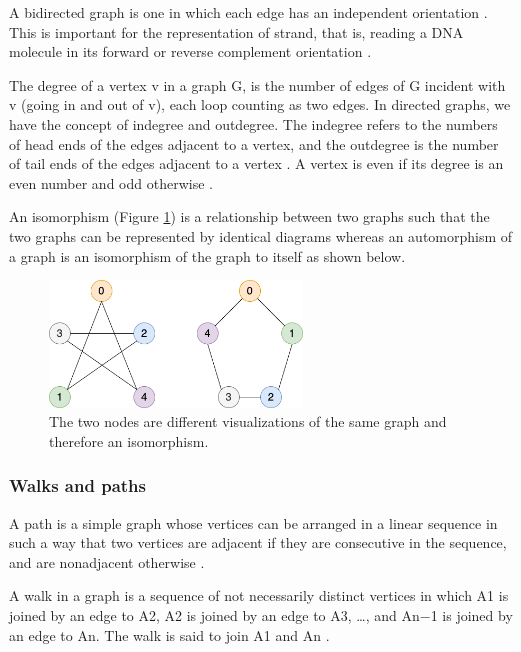 \documentclass[10pt, a4paper]{article}
\begin{document}
A bidirected graph is one in which each edge has an independent orientation
\cite{edmondsMatchingWellSolvedClass2003}.
This is important for the representation of strand,
that is, reading a DNA molecule in its forward or reverse complement orientation
\cite{patenGenomeGraphsEvolution2017}.

The degree of a vertex v in a graph G, is the number of edges of G incident with
v (going in and out of v), each loop counting as two edges.
In directed graphs, we have the concept of indegree and outdegree.
The indegree refers to the numbers of head ends of the edges adjacent to a
vertex, and the outdegree is the number of tail ends of the edges adjacent to a
vertex \cite{bondyGraphTheory2011}. A vertex is even if its degree is an even number
and odd otherwise \cite{trudeauIntroductionGraphTheory1993}.

An isomorphism (Figure \ref{fig:orgf79db24}) is a relationship between two graphs such
that the two graphs can be represented by identical diagrams
\cite{bondyGraphTheory2011}
whereas an automorphism of a graph is an isomorphism of the graph to itself as
shown below.

\begin{figure}[h]
\centering
\includegraphics[width=0.6\textwidth]{../Figures/Isomorphism.png}
\caption[A graph isomorphism]{\label{fig:orgf79db24}The two nodes are different visualizations of the same graph and therefore an isomorphism.}
\end{figure}

\subsubsection{Walks and paths}
\label{sec:orgdcf114f}
A path is a simple graph whose vertices can be arranged in a linear sequence in
such a way that two vertices are adjacent if they are consecutive in the
sequence, and are nonadjacent otherwise \cite{bondyGraphTheory2011}.


A walk in a graph is a sequence  of not necessarily distinct vertices in which
A1 is joined by an edge to A2, A2 is joined by an edge to A3, \ldots{}, and An−1 is
joined by an edge to An. The walk is said to join A1 and An
\cite{trudeauIntroductionGraphTheory1993}.
\end{document}
